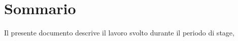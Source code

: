 \cleardoublepage
{}
{}
\begingroup
\let\clearpage\relax
\let\cleardoublepage\relax
\chapter*{Sommario}

Il presente documento descrive il lavoro svolto durante il periodo di stage, 

\endgroup
\vfill
